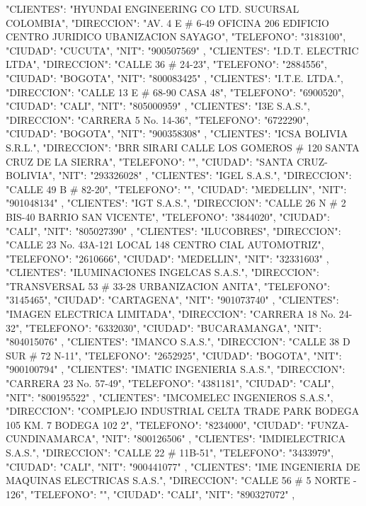    {
   "CLIENTES": "HYUNDAI ENGINEERING CO LTD. SUCURSAL COLOMBIA",
   "DIRECCION": "AV. 4 E # 6-49 OFICINA 206 EDIFICIO CENTRO JURIDICO UBANIZACION SAYAGO",
   "TELEFONO": "3183100",
   "CIUDAD": "CUCUTA",
   "NIT": "900507569"
   },
   {
   "CLIENTES": "I.D.T. ELECTRIC LTDA",
   "DIRECCION": "CALLE 36 # 24-23",
   "TELEFONO": "2884556",
   "CIUDAD": "BOGOTA",
   "NIT": "800083425"
   },
   {
   "CLIENTES": "I.T.E. LTDA.",
   "DIRECCION": "CALLE 13 E # 68-90 CASA 48",
   "TELEFONO": "6900520",
   "CIUDAD": "CALI",
   "NIT": "805000959"
   },
   {
   "CLIENTES": "I3E S.A.S.",
   "DIRECCION": "CARRERA 5 No. 14-36",
   "TELEFONO": "6722290",
   "CIUDAD": "BOGOTA",
   "NIT": "900358308"
   },
   {
   "CLIENTES": "ICSA BOLIVIA S.R.L.",
   "DIRECCION": "BRR SIRARI CALLE LOS GOMEROS # 120 SANTA CRUZ DE LA SIERRA",
   "TELEFONO": "",
   "CIUDAD": "SANTA CRUZ-BOLIVIA",
   "NIT": "293326028"
   },
   {
   "CLIENTES": "IGEL S.A.S.",
   "DIRECCION": "CALLE 49 B # 82-20",
   "TELEFONO": "",
   "CIUDAD": "MEDELLIN",
   "NIT": "901048134"
   },
   {
   "CLIENTES": "IGT S.A.S.",
   "DIRECCION": "CALLE 26 N # 2 BIS-40 BARRIO SAN VICENTE",
   "TELEFONO": "3844020",
   "CIUDAD": "CALI",
   "NIT": "805027390"
   },
   {
   "CLIENTES": "ILUCOBRES",
   "DIRECCION": "CALLE 23 No. 43A-121 LOCAL 148 CENTRO CIAL AUTOMOTRIZ",
   "TELEFONO": "2610666",
   "CIUDAD": "MEDELLIN",
   "NIT": "32331603"
   },
   {
   "CLIENTES": "ILUMINACIONES INGELCAS S.A.S.",
   "DIRECCION": "TRANSVERSAL 53 # 33-28 URBANIZACION ANITA",
   "TELEFONO": "3145465",
   "CIUDAD": "CARTAGENA",
   "NIT": "901073740"
   },
   {
   "CLIENTES": "IMAGEN ELECTRICA LIMITADA",
   "DIRECCION": "CARRERA 18 No. 24-32",
   "TELEFONO": "6332030",
   "CIUDAD": "BUCARAMANGA",
   "NIT": "804015076"
   },
   {
   "CLIENTES": "IMANCO S.A.S.",
   "DIRECCION": "CALLE 38 D SUR # 72 N-11",
   "TELEFONO": "2652925",
   "CIUDAD": "BOGOTA",
   "NIT": "900100794"
   },
   {
   "CLIENTES": "IMATIC INGENIERIA S.A.S.",
   "DIRECCION": "CARRERA 23 No. 57-49",
   "TELEFONO": "4381181",
   "CIUDAD": "CALI",
   "NIT": "800195522"
   },
   {
   "CLIENTES": "IMCOMELEC INGENIEROS S.A.S.",
   "DIRECCION": "COMPLEJO INDUSTRIAL CELTA TRADE PARK BODEGA 105 KM. 7 BODEGA 102 2",
   "TELEFONO": "8234000",
   "CIUDAD": "FUNZA-CUNDINAMARCA",
   "NIT": "800126506"
   },
   {
   "CLIENTES": "IMDIELECTRICA S.A.S.",
   "DIRECCION": "CALLE 22 # 11B-51",
   "TELEFONO": "3433979",
   "CIUDAD": "CALI",
   "NIT": "900441077"
   },
   {
   "CLIENTES": "IME INGENIERIA DE MAQUINAS ELECTRICAS S.A.S.",
   "DIRECCION": "CALLE 56 # 5 NORTE - 126",
   "TELEFONO": "",
   "CIUDAD": "CALI",
   "NIT": "890327072"
   },
